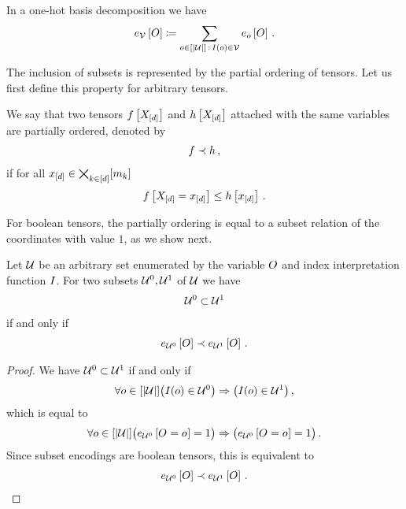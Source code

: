 In a one-hot basis decomposition we have
\begin{align*}
	e_{\mathcal{V}}\left[O\right]
	\coloneqq \sum_{o\in[\left|\mathcal{U}\right|]\,:\,I(o)\in\mathcal{V}}e_{o}\left[O\right] \, .
\end{align*}


The inclusion of subsets is represented by the partial ordering of tensors.
Let us first define this property for arbitrary tensors.

\begin{definition}\label{def:partialOrder}
	We say that two tensors $f\left[X_{[d]}\right]$ and $h\left[X_{[d]}\right]$ attached with the same variables are partially ordered, denoted by
	\begin{align*}
		{f}\prec{h} \, ,
	\end{align*}
	if for all $x_{[d]}\in\bigtimes_{k\in[d]}[m_{k}]$
	\begin{align*}
		 f\left[X_{[d]}=x_{[d]}\right] \leq h\left[x_{[d]}\right]  \, .
	\end{align*}
\end{definition}

For boolean tensors, the partially ordering is equal to a subset relation of the coordinates with value $1$, as we show next.

\begin{theorem}\label{the:subsetRelationSubsetEncoding}
	Let $\mathcal{U}$ be an arbitrary set enumerated by the variable $O$ and index interpretation function $I$.
	For two subsets $\mathcal{U}^{0},\mathcal{U}^{1}$ of $\mathcal{U}$ we have
	\begin{align*}
		\mathcal{U}^{0} \subset \mathcal{U}^{1}
	\end{align*}
	if and only if
	\begin{align*}
		e_{\mathcal{U}^{0}}\left[O\right] \prec e_{\mathcal{U}^{1}}\left[O\right] \, .
	\end{align*}
\end{theorem}
\begin{proof}
	We have $\mathcal{U}^{0} \subset \mathcal{U}^{1}$ if and only if
	\begin{align*}
		\forall{o\in[\left|\mathcal{U}\right|]} \big(I(o)\in\mathcal{U}^{0}\big) \Rightarrow \big(I(o)\in\mathcal{U}^{1}\big) \, ,
	\end{align*}
	which is equal to
	\begin{align*}
		\forall{o\in[\left|\mathcal{U}\right|]} \big(e_{\mathcal{U}^{0}}\left[O_{}=o_{}\right]=1\big) \Rightarrow \big(e_{\mathcal{U}^{0}}\left[O_{}=o_{}\right]=1\big)  \, .
	\end{align*}
	Since subset encodings are boolean tensors, this is equivalent to
	\begin{align*}
		e_{\mathcal{U}^{0}}\left[O\right] \prec e_{\mathcal{U}^{1}}\left[O\right] \, .
	\end{align*}
\end{proof}

